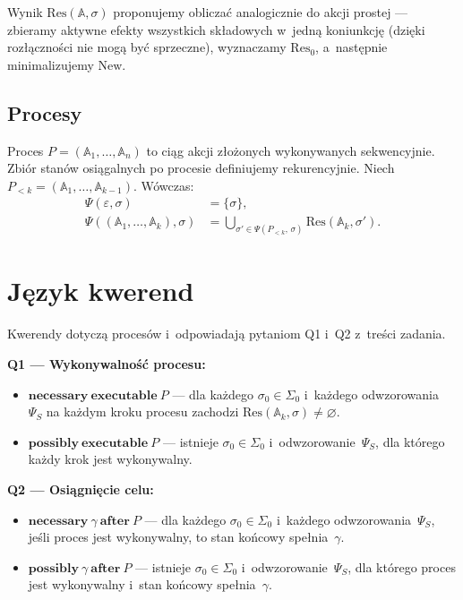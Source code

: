 \documentclass[11pt,a4paper]{article}
\newcommand{\aft}{\textbf{after}}
\newcommand{\necessary}{\textbf{necessary}}
\newcommand{\possibly}{\textbf{possibly}}
\newcommand{\executable}{\textbf{executable}}
\newcommand{\Res}{\mathrm{Res}}
\newcommand{\New}{\mathrm{New}}
\begin{document}
Wynik $\Res(\mathbb{A}, \sigma)$ proponujemy obliczać analogicznie do
akcji prostej --- zbieramy aktywne efekty wszystkich składowych w~jedną
koniunkcję (dzięki rozłączności nie mogą być sprzeczne), wyznaczamy $\Res_0$,
a~następnie minimalizujemy $\New$.

\subsection{Procesy}

Proces $P = (\mathbb{A}_1, \ldots, \mathbb{A}_n)$ to ciąg akcji złożonych
wykonywanych sekwencyjnie. Zbiór stanów osiągalnych po procesie definiujemy
rekurencyjnie. Niech $P_{<k} = (\mathbb{A}_1, \ldots, \mathbb{A}_{k-1})$.
Wówczas:
\begin{align*}
  \Psi(\varepsilon, \sigma) &= \{\sigma\}, \\[4pt]
  \Psi((\mathbb{A}_1, \ldots, \mathbb{A}_k), \sigma)
    &= \bigcup\nolimits_{\sigma' \in \Psi(P_{<k},\,\sigma)} \Res(\mathbb{A}_k, \sigma').
\end{align*}

\section{Język kwerend}

Kwerendy dotyczą procesów i~odpowiadają pytaniom Q1 i~Q2
z~treści zadania.

\medskip
\noindent\textbf{Q1 --- Wykonywalność procesu:}
\begin{itemize}
  \item $\necessary\ \executable\ P$ ---
    dla każdego $\sigma_0 \in \Sigma_0$ i~każdego odwzorowania~$\Psi_S$
    na każdym kroku procesu zachodzi $\Res(\mathbb{A}_k, \sigma) \neq \varnothing$.
  \item $\possibly\ \executable\ P$ ---
    istnieje $\sigma_0 \in \Sigma_0$ i~odwzorowanie~$\Psi_S$,
    dla którego każdy krok jest wykonywalny.
\end{itemize}

\medskip
\noindent\textbf{Q2 --- Osiągnięcie celu:}
\begin{itemize}
  \item $\necessary\ \gamma\ \aft\ P$ ---
    dla każdego $\sigma_0 \in \Sigma_0$ i~każdego odwzorowania~$\Psi_S$,
    jeśli proces jest wykonywalny, to stan końcowy spełnia~$\gamma$.
  \item $\possibly\ \gamma\ \aft\ P$ ---
    istnieje $\sigma_0 \in \Sigma_0$ i~odwzorowanie~$\Psi_S$, dla którego
    proces jest wykonywalny i~stan końcowy spełnia~$\gamma$.
\end{itemize}
\end{document}
